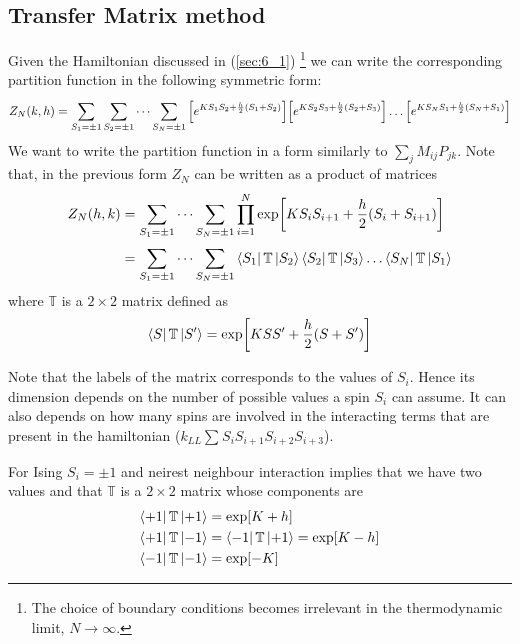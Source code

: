 \documentclass[../main/main.tex]{subfiles}
\begin{document}

\subsection{Transfer Matrix method}
Given the Hamiltonian discussed in (\ref{sec:6_1}) \footnote{The choice of boundary conditions becomes irrelevant in the thermodynamic limit, \( N \rightarrow \infty  \).} we can write the corresponding partition function in the following symmetric form:
\begin{equation}
  Z_N (k,h) = \sum_{S_1 = \pm 1}^{} \sum_{S_2 = \pm 1}^{}  \dots \sum_{S_N = \pm 1}^{}
  \qty[e^{K S_1 S_2 + \frac{h}{2}(S_1+S_2)} ] \qty[e^{K S_2 S_3 + \frac{h}{2}(S_2+S_3)} ] \dots \qty[e^{K S_N S_1 + \frac{h}{2}(S_N+S_1)} ]
\end{equation}
We want to write the partition function in a form similarly to \( \sum_{j}^{}  M_{ij} P_{jk} \).
Note that, in the previous form \( Z_N \) can be written as a product of matrices
\begin{equation}
\begin{split}
Z_N (h,k)  &= \sum_{S_1 = \pm 1}^{} \dots \sum_{S_N = \pm 1}^{} \prod_{i=1}^{N} \exp [K S_i S_{i+1} + \frac{h}{2} (S_i + S_{i+1})] \\
& =  \sum_{S_1 = \pm 1}^{} \dots \sum_{S_N = \pm 1}^{} \bra{S_1} \mathbb{T} \ket{S_2} \bra{S_2}  \mathbb{T} \ket{S_3} \dots \bra{S_N}  \mathbb{T} \ket{S_1}
\end{split}
\end{equation}
where \( \mathbb{T} \) is a \( 2 \times 2 \)  matrix defined as
\begin{equation}
  \bra{S} \mathbb{T} \ket{S'} = \exp [K S S' + \frac{h}{2} (S+S')]
\end{equation}
\begin{remark}
  Note that the labels of the matrix corresponds to the values of \( S_i \). Hence its dimension depends on the number of possible values a spin \( S_i \) can assume.
  It can also depends on how many spins are involved in the interacting terms that are present in the hamiltonian (\( k_{LL} \sum_{}^{} S_i S_{i+1} S_{i+2} S_{i+3}  \)).
\end{remark}
 For Ising \( S_i = \pm 1 \) and neirest neighbour interaction implies that we have two values and that \( \mathbb{T} \) is a \( 2 \times 2 \) matrix whose components are
\begin{subequations}
\begin{align}
  \bra{+1} \mathbb{T} \ket{+1} &= \exp [K+h]  \\
    \bra{+1} \mathbb{T} \ket{-1} &=   \bra{-1} \mathbb{T} \ket{+1} = \exp [K-h] \\
      \bra{-1} \mathbb{T} \ket{-1} &= \exp [-K]
\end{align}
\end{subequations}
\end{document}
